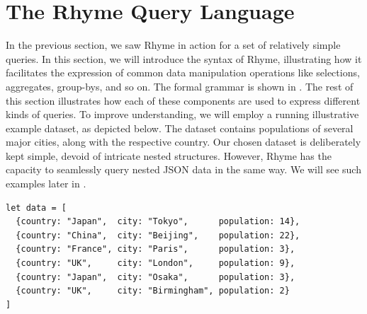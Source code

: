 \documentclass[runningheads]{llncs}
\newcommand{\lang}{Rhyme}
\begin{document}
\section{The \lang{} Query Language}\label{sec:query_language}
\vspace{-2mm}
In the previous section, we saw \lang{} in action for a set of relatively simple queries.
In this section, we will introduce the syntax of \lang{}, illustrating
how it facilitates the expression of common data manipulation operations like
selections, aggregates, group-bys, and so on.
The formal grammar is shown in .
The rest of this section illustrates how each of these components are used to express
different kinds of queries.
To improve understanding, we will employ a running illustrative example dataset, as
depicted below.
The dataset contains populations of several major cities,
along with the respective country.
Our chosen dataset is deliberately kept simple, devoid of
intricate nested structures.
However, \lang{} has the capacity to seamlessly query
nested JSON data in the same way.
We will see such examples later in .

\begin{lstlisting}[style=JavaScript]
let data = [
  {country: "Japan",  city: "Tokyo",      population: 14},
  {country: "China",  city: "Beijing",    population: 22},
  {country: "France", city: "Paris",      population: 3},
  {country: "UK",     city: "London",     population: 9},
  {country: "Japan",  city: "Osaka",      population: 3},
  {country: "UK",     city: "Birmingham", population: 2}
]
\end{lstlisting}
\end{document}
